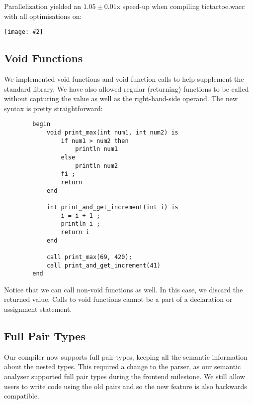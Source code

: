\documentclass{article}
\newcommand{\centerimage}[2]{\begin{center}
    \texttt{[image: \#2]}
\end{center}}
\begin{document}
        Parallelization yielded an $1.05 \pm 0.01$x speed-up when compiling tictactoe.wacc with all optimisations on:
        \centerimage{1}{whisker_plot}
        
        \subsection*{Void Functions}
        We implemented void functions and void function calls to help supplement the standard library. We have also allowed regular (returning) functions to be called without capturing the value as well as the right-hand-side operand. The new syntax is pretty straightforward:
        \begin{verbatim}
        begin
            void print_max(int num1, int num2) is
                if num1 > num2 then
                    println num1
                else
                    println num2
                fi ;
                return 
            end
            
            int print_and_get_increment(int i) is
                i = i + 1 ;
                println i ;
                return i
            end
            
            call print_max(69, 420);
            call print_and_get_increment(41)
        end
        \end{verbatim}
        Notice that we can call non-void functions as well. In this case, we discard the returned value. Calls to void functions cannot be a part of a declaration or assignment statement.
        
        \subsection*{Full Pair Types}
        Our compiler now supports full pair types, keeping all the semantic information about the nested types. This required a change to the parser, as our semantic analyser supported full pair types during the frontend milestone. We still allow users to write code using the old pairs and so the new feature is also backwards compatible.
        
\end{document}
